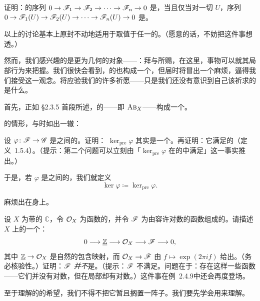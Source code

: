 \begin{exercise}\label{ex:presheaf-exactness-termwise}
证明：\trPresheaf{}的序列 $0\to\mathscr{F}_1\to\mathscr{F}_2\to\dotsb\to\mathscr{F}_n\to 0$ 是\trExactSequence，当且仅当对一切 $U$，序列 $0\to\mathscr{F}_1(U)\to\mathscr{F}_2(U)\to\dotsb\to\mathscr{F}_n(U)\to 0$ 是\trExactSequence。
\end{exercise}

以上的讨论基本上原封不动地适用于取值于任一\trAbelianCategory{}的\trPresheaf{}。（愿意的话，不妨把这件事想透。）

然而，我们感兴趣的是更为几何的对象——\trSheaves{}：拜\trIdentityAxiom{}与\trGluingAxiom{}所赐，在\trSheaf{}这里，事物可以就其局部行为来把握。我们很快会看到，\trAbelianGroups{}的\trSheaf{}也构成一个\trAbelianCategory，但届时将冒出一个麻烦，逼得我们接受\emph{\trSheafification}这一观念。\trSheafification{}将应验我们的许多祈愿——只是我们还没有意识到自己该祈求的是什么。

首先，正如 \S2.3.5 首段所述，\trAbelianGroups{}的\trSheaves{}——即\trCategory{} $\textsc{Ab}_{X}$——构成一个\trAdditiveCategory。

\trKernel{}的情形，与\trPresheaf{}时如出一辙：

\begin{exercise}[重要练习]\label{ex:sheaf-kernel-is-sheaf}
设 $\varphi\colon\mathscr{F}\to\mathscr{G}$ 是\emph{\trSheaf}之间的\trMorphism。证明：\trPresheaf\trKernel{} $\ker_{\mathrm{pre}}\varphi$ 其实是一个\trSheaf{}。再证明：它满足\trKernel{}的\trUniversalProperty{}（\mbox{定义~1.5.4}）。（提示：第二个问题可以立刻由「$\ker_{\mathrm{pre}}\varphi$ 在\emph{\trPresheaf}的\trCategory{}中满足\trUniversalProperty{}」这一事实推出。）
\end{exercise}

于是，若 $\varphi$ 是\trSheaf{}之间的\trMorphism，我们就定义
\[
\ker\varphi\coloneqq\ker_{\mathrm{pre}}\varphi.
\]

麻烦出在\trCokernel{}身上。

\begin{exercise}[重要练习]\label{ex:holomorphic-logarithm-sequence}
设 $X$ 为带\trClassicalTopology{}的 $\mathbb{C}$，令 $\mathcal{O}_X$ 为\trHolomorphic{}函数的\trSheaf，并令 $\mathscr{F}$ 为由容许\trHolomorphic{}对数的函数组成的\emph{\trPresheaf}。请描述 $X$ 上\trPresheaf{}的一个\trExactSequence{}：
\[
0\longrightarrow\underline{\mathbb{Z}}\longrightarrow\mathcal{O}_X\longrightarrow\mathscr{F}\longrightarrow 0,
\]
其中 $\underline{\mathbb{Z}}\to\mathcal{O}_X$ 是自然的包含映射，而 $\mathcal{O}_X\to\mathscr{F}$ 由 $f\mapsto\exp(2\pi i f)$ 给出。（务必核验\trExact{}性。）证明：$\mathscr{F}$ \emph{并不}是\trSheaf{}。（提示：$\mathscr{F}$ 不满足\trGluability{}。问题在于：存在这样一些函数——它们并没有对数，但在局部却有对数。）这件事在\mbox{例~2.4.9}中还会再度登场。
\end{exercise}

至于理解\trSheaf{}的\trCokernel{}的希望，我们不得不把它暂且搁置一阵子。我们要先学会用\trStalk{}来理解\trSheaf。
